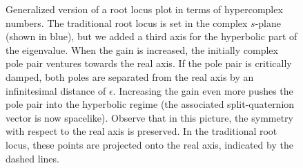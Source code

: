 \begin{figure}[ht]
    \centering
    
    \caption{Generalized version of a root locus plot in terms of hypercomplex numbers. The traditional root locus is set in the complex $s$-plane (shown in blue), but we added a third axis for the hyperbolic part of the eigenvalue. When the gain is increased, the initially complex pole pair ventures towards the real axis. If the pole pair is critically damped, both poles are separated from the real axis by an infinitesimal distance of $\epsilon$. Increasing the gain even more pushes the pole pair into the hyperbolic regime (the associated split-quaternion vector is now spacelike). Observe that in this picture, the symmetry with respect to the real axis is preserved. In the traditional root locus, these points are projected onto the real axis, indicated by the dashed lines. }
    \label{fig:root_locus}
\end{figure}


